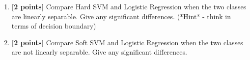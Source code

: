 \documentclass{article}
\begin{document}
\begin{enumerate}
	(2) \textbf{[3 points]} In the primal optimization of SVM, what's the role of the coefficient $C$?
	Briefly explain your answer by considering two extreme cases, i.e., $C\rightarrow 0$ and $C\rightarrow\infty$.



	\item\textbf{[2 points]} Compare Hard SVM and Logistic Regression when the two classes are linearly separable. Give any significant differences. (*Hint* - think in terms of decision boundary)



	\item\textbf{[2 points]} Compare Soft SVM and Logistic Regression when the two classes are not linearly separable. Give any significant differences.




\end{enumerate}
\end{document}
